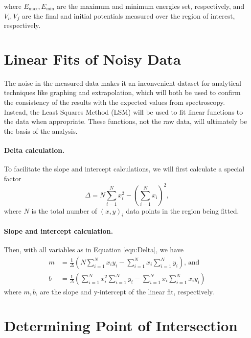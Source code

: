 where $E_{\text{max}}, E_{\text{min}}$ are the maximum and minimum energies set, respectively, and $V_i, V_f$ are the final and initial potentials measured over the region of interest, respectively.

\section{Linear Fits of Noisy Data}
\paragraph{}
The noise in the measured data makes it an inconvenient dataset for analytical techniques like graphing and extrapolation, which will both be used to confirm the consistency of the results with the expected values from spectroscopy. Instead, the Least Squares Method (LSM) will be used to fit linear functions to the data when appropriate. These functions, not the raw data, will ultimately be the basis of the analysis.

\paragraph{Delta calculation.}
To facilitate the slope and intercept calculations, we will first calculate a special factor
\begin{equation} 
    \Delta = N \sum_{i=1}^N x_i^2 - \left(\sum_{i=1}^N x_i\right)^2, \label{eqn:Delta}
\end{equation}
where $N$ is the total number of $(x,y)_i$ data points in the region being fitted.

\paragraph{Slope and intercept calculation.}
Then, with all variables as in Equation \ref{eqn:Delta}, we have
\begin{align}
    m &= \frac{1}{\Delta} \left(N \sum_{i=1}^N x_i y_i - \sum_{i=1}^N x_i \sum_{i=1}^N y_i\right) \text{, and} \label{eqn:slope} \\
    b &= \frac{1}{\Delta} \left(\sum_{i=1}^N x_i^2 \sum_{i=1}^N y_i - \sum_{i=1}^N x_i \sum_{i=1}^N x_i y_i\right) \label{eqn:intercept}
\end{align}
where $m, b$, are the slope and y-intercept of the linear fit, respectively.

\section{Determining Point of Intersection}
